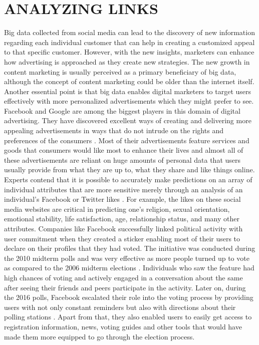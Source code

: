 \documentclass[sigconf]{acmart}
\begin{document}
\section{ANALYZING LINKS}

Big data collected from social media can lead to the discovery of new information regarding each individual customer that can help in creating a customized appeal to that specific customer. However, with the new insights, marketers can enhance how advertising is approached as they create new strategies. The new growth in content marketing is usually perceived as a primary beneficiary of big data, although the concept of content marketing could be older than the internet itself. \\
Another essential point is that big data enables digital marketers to target users effectively with more personalized advertisements which they might prefer to see. Facebook and Google are among the biggest players in this domain of digital advertising. They have discovered excellent ways of creating and delivering more appealing advertisements in ways that do not intrude on the rights and preferences of the consumers  \cite{MangoldandFaulds2009}. Most of their advertisements feature services and goods that consumers would like most to enhance their lives and almost all of these advertisements are reliant on huge amounts of personal data that users usually provide from what they are up to, what they share and like things online.  \\

Experts contend that it is possible to accurately make predictions on an array of individual attributes that are more sensitive merely through an analysis of an individual’s Facebook or Twitter likes \cite{7}. For example, the likes on these social media websites are critical in predicting one’s religion, sexual orientation, emotional stability, life satisfaction, age, relationship status, and many other attributes. Companies like Facebook successfully linked political activity with user commitment when they created a sticker enabling most of their users to declare on their profiles that they had voted. The initiative was conducted during the 2010 midterm polls and was very effective as more people turned up to vote as compared to the 2006 midterm elections \cite{9}. Individuals who saw the feature had high chances of voting and actively engaged in a conversation about the same after seeing their friends and peers participate in the activity. Later on, during the 2016 polls, Facebook escalated their role into the voting process by providing users with not only constant reminders but also with directions about their polling stations \cite{Perez2016}. Apart from that, they also enabled users to easily get access to registration information, news, voting guides and other tools that would have made them more equipped to go through the election process.
\end{document}
